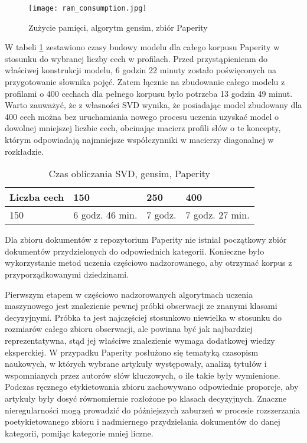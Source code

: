 \documentclass{pracamgr}
\begin{document}
\begin{figure}[]
\centering
  \texttt{[image: ram\_consumption.jpg]}
  \caption{Zużycie pamięci, algorytm gensim, zbiór Paperity}\label{fig:ram_consumption}
\end{figure}

W tabeli \ref{gensim:running_times} zestawiono czasy budowy modelu dla całego korpusu Paperity w stosunku do wybranej liczby cech w profilach. Przed przystąpienienm do właściwej konstrukcji modelu, 6 godzin 22 minuty zostało poświęconych na przygotowanie słownika pojęć. Zatem łącznie na zbudowanie całego modelu z profilami o 400 cechach dla pełnego korpusu było potrzeba 13 godzin 49 minut. Warto zauważyć, że z własności SVD wynika, że posiadając model zbudowany dla 400 cech można bez uruchamiania nowego procesu uczenia uzyskać model o dowolnej mniejszej liczbie cech, obcinając macierz profili słów o te koncepty, którym odpowiadają najmniejsze współczynniki w macierzy diagonalnej w rozkładzie.

\begin{table}[]
\centering
\begin{tabular}{@{}llll@{}}
\toprule
Liczba cech & 150 & 250 & 400 \\ \midrule
150 & 6 godz. 46 min. & 7 godz. & 7 godz. 27 min. \\ \bottomrule
\end{tabular}
\caption{Czas obliczania SVD, gensim, Paperity}
\label{gensim:running_times}
\end{table}

Dla zbioru dokumentów z repozytorium Paperity nie istniał początkowy zbiór dokumentów przydzielonych do odpowiednich kategorii. Konieczne było wykorzystanie metod uczenia częściowo nadzorowanego, aby otrzymać korpus z przyporządkowanymi dziedzinami.

Pierwszym etapem w częściowo nadzorowanych algorytmach uczenia maszynowego jest znalezienie pewnej próbki obserwacji ze znanymi klasami decyzyjnymi. Próbka ta jest najczęściej stosunkowo niewielka w stosunku do rozmiarów całego zbioru obserwacji, ale powinna być jak najbardziej reprezentatywna, stąd jej właściwe znalezienie wymaga dodatkowej wiedzy eksperckiej. W przypadku Paperity posłużono się tematyką czasopism naukowych, w których wybrane artykuły występowały, analizą tytułów i wspomnianych przez autorów słów kluczowych, o ile takie były wymienione. Podczas ręcznego etykietowania zbioru zachowywano odpowiednie proporcje, aby artykuły były dosyć równomiernie rozłożone po klasach decyzyjnych. Znaczne nieregularności mogą prowadzić do późniejszych zaburzeń w procesie rozszerzania poetykietowanego zbioru i nadmiernego przydzielania dokumentów do danej kategorii, pomijąc kategorie mniej liczne.
\end{document}
